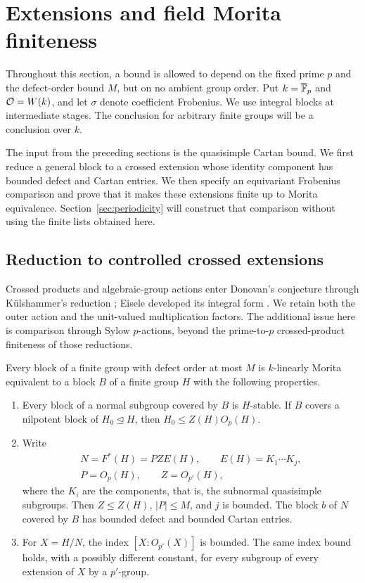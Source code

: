 \section{Extensions and field Morita finiteness}\label{sec:extensions}

Throughout this section, a bound is allowed to depend on the fixed prime
$p$ and the defect-order bound $M$, but on no ambient group order.  Put
$k=\overline{\mathbb F}_p$ and $\mathcal O=W(k)$, and let $\sigma$ denote coefficient
Frobenius.  We use integral blocks at intermediate stages.  The conclusion
for arbitrary finite groups will be a conclusion over $k$.

The input from the preceding sections is the quasisimple Cartan
bound.  We first reduce a general block to a crossed extension
whose identity component has bounded defect and Cartan entries.
We then specify an equivariant Frobenius comparison and prove
that it makes these extensions finite up to Morita equivalence.
Section~\ref{sec:periodicity} will construct that comparison
without using the finite lists obtained here.

\subsection{Reduction to controlled crossed extensions}

Crossed products and algebraic-group actions enter Donovan's
conjecture through K\"ulshammer's reduction
\cite{Kulshammer1995}; Eisele developed its integral form
\cite{EiseleReduction}.  We retain both the outer action and the
unit-valued multiplication factors.  The additional issue here is
comparison through Sylow $p$-actions, beyond the prime-to-$p$
crossed-product finiteness of those reductions.

\begin{lemma}\label{lem:ext:reduced-structure}
Every block of a finite group with defect order at most $M$ is
$k$-linearly Morita equivalent to a block $B$ of a finite group $H$ with
the following properties.
\begin{enumerate}
\item Every block of a normal subgroup covered by $B$ is $H$-stable.
If $B$ covers a nilpotent block of $H_0\trianglelefteq H$, then
$H_0\leq Z(H)O_p(H)$.
\item Write
\[
 \begin{gathered}
 N=F^*(H)=PZE(H),\qquad E(H)=K_1\cdots K_j,\\
 P=O_p(H),\qquad Z=O_{p'}(H),
 \end{gathered}
\]
where the $K_i$ are the components, that is, the subnormal quasisimple
subgroups.  Then $Z\leq Z(H)$, $|P|\leq M$, and $j$ is bounded.  The
block $b$ of $N$ covered by $B$ has bounded defect and bounded Cartan
entries.
\item For $X=H/N$, the index $[X:O_{p'}(X)]$ is bounded.  The same
index bound holds, with a possibly different constant, for every
subgroup of every extension of $X$ by a $p'$-group.
\end{enumerate}
\end{lemma}

